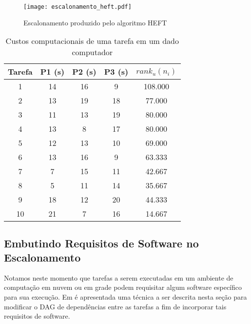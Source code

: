 \begin{figure}[ht]
\centering
\texttt{[image: escalonamento\_heft.pdf]}
\caption{Escalonamento produzido pelo algoritmo HEFT}
\label{fig:escalonamento_heft}
\end{figure}


\begin{table}[ht]
	\centering
    \begin{tabular}{|c|c|c|c|c|}
    \hline
    \textbf{Tarefa} & \textbf{P1 (s)} & \textbf{P2 (s)} & \textbf{P3 (s)} & $rank_u(n_i)$ \\ \hline
	1               & 14          & 16          & 9           & 108.000       \\
	2               & 13          & 19          & 18          & 77.000        \\
	3               & 11          & 13          & 19          & 80.000        \\
	4               & 13          & 8           & 17          & 80.000        \\
	5               & 12          & 13          & 10          & 69.000        \\
	6               & 13          & 16          & 9           & 63.333        \\
	7               & 7           & 15          & 11          & 42.667        \\
	8               & 5           & 11          & 14          & 35.667        \\
	9               & 18          & 12          & 20          & 44.333        \\
	10              & 21          & 7           & 16          & 14.667        \\ \hline
    \end{tabular}
    \caption {Custos computacionais de uma tarefa em um dado
    computador}
    \label{tab:custos_computacionais}
\end{table}


\subsection{Embutindo Requisitos de Software no Escalonamento}
Notamos neste momento que tarefas a serem executadas em um ambiente de
computação em nuvem ou em grade podem requisitar algum software específico para
sua execução. Em \cite{batista:embedding_software_requirements} é apresentada
uma técnica a ser descrita nesta seção para modificar o DAG de dependências
entre as tarefas a fim de incorporar tais requisitos de software.

